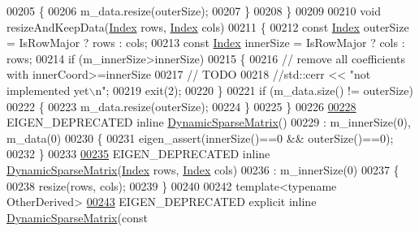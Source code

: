 \begin{DoxyCode}
00205       \{
00206         m\_data.resize(outerSize);
00207       \}
00208     \}
00209 
00210     \textcolor{keywordtype}{void} resizeAndKeepData(\hyperlink{group___core___module_a554f30542cc2316add4b1ea0a492ff02}{Index} rows, \hyperlink{group___core___module_a554f30542cc2316add4b1ea0a492ff02}{Index} cols)
00211     \{
00212       \textcolor{keyword}{const} \hyperlink{group___core___module_a554f30542cc2316add4b1ea0a492ff02}{Index} outerSize = IsRowMajor ? rows : cols;
00213       \textcolor{keyword}{const} \hyperlink{group___core___module_a554f30542cc2316add4b1ea0a492ff02}{Index} innerSize = IsRowMajor ? cols : rows;
00214       \textcolor{keywordflow}{if} (m\_innerSize>innerSize)
00215       \{
00216         \textcolor{comment}{// remove all coefficients with innerCoord>=innerSize}
00217         \textcolor{comment}{// TODO}
00218         \textcolor{comment}{//std::cerr << "not implemented yet\(\backslash\)n";}
00219         exit(2);
00220       \}
00221       \textcolor{keywordflow}{if} (m\_data.size() != outerSize)
00222       \{
00223         m\_data.resize(outerSize);
00224       \}
00225     \}
00226 
\hyperlink{class_eigen_1_1_dynamic_sparse_matrix_a46a6947fcf115e6b7b731a8e01e7995d}{00228}     EIGEN\_DEPRECATED \textcolor{keyword}{inline} \hyperlink{class_eigen_1_1_dynamic_sparse_matrix_a46a6947fcf115e6b7b731a8e01e7995d}{DynamicSparseMatrix}()
00229       : m\_innerSize(0), m\_data(0)
00230     \{
00231       eigen\_assert(innerSize()==0 && outerSize()==0);
00232     \}
00233 
\hyperlink{class_eigen_1_1_dynamic_sparse_matrix_ad1c810ff3cfcc97db704d26b9d114f94}{00235}     EIGEN\_DEPRECATED \textcolor{keyword}{inline} \hyperlink{class_eigen_1_1_dynamic_sparse_matrix_ad1c810ff3cfcc97db704d26b9d114f94}{DynamicSparseMatrix}(\hyperlink{group___core___module_a554f30542cc2316add4b1ea0a492ff02}{Index} rows, 
      \hyperlink{group___core___module_a554f30542cc2316add4b1ea0a492ff02}{Index} cols)
00236       : m\_innerSize(0)
00237     \{
00238       resize(rows, cols);
00239     \}
00240 
00242     \textcolor{keyword}{template}<\textcolor{keyword}{typename} OtherDerived>
\hyperlink{class_eigen_1_1_dynamic_sparse_matrix_ab5bd886d79beb30802df0b1508727482}{00243}     EIGEN\_DEPRECATED \textcolor{keyword}{explicit} \textcolor{keyword}{inline} \hyperlink{class_eigen_1_1_dynamic_sparse_matrix_ab5bd886d79beb30802df0b1508727482}{DynamicSparseMatrix}(\textcolor{keyword}{const} 

\end{DoxyCode}
